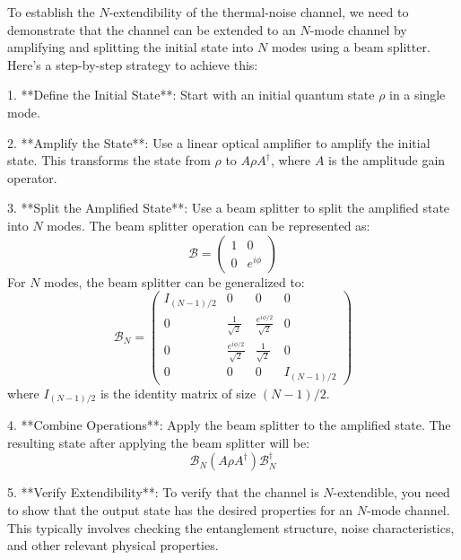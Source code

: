 To establish the \( N \)-extendibility of the thermal-noise channel, we need to demonstrate that the channel can be extended to an \( N \)-mode channel by amplifying and splitting the initial state into \( N \) modes using a beam splitter. Here's a step-by-step strategy to achieve this:

1. **Define the Initial State**: Start with an initial quantum state \(\rho\) in a single mode.

2. **Amplify the State**: Use a linear optical amplifier to amplify the initial state. This transforms the state from \(\rho\) to \(A\rho A^\dagger\), where \(A\) is the amplitude gain operator.

3. **Split the Amplified State**: Use a beam splitter to split the amplified state into \(N\) modes. The beam splitter operation can be represented as:
   \[
   \mathcal{B} = \begin{pmatrix}
   1 & 0 \\
   0 & e^{i\phi}
   \end{pmatrix}
   \]
   For \(N\) modes, the beam splitter can be generalized to:
   \[
   \mathcal{B}_N = \begin{pmatrix}
   I_{(N-1)/2} & 0 & 0 & 0 \\
   0 & \frac{1}{\sqrt{2}} & \frac{e^{i\phi/2}}{\sqrt{2}} & 0 \\
   0 & \frac{e^{i\phi/2}}{\sqrt{2}} & \frac{1}{\sqrt{2}} & 0 \\
   0 & 0 & 0 & I_{(N-1)/2}
   \end{pmatrix}
   \]
   where \(I_{(N-1)/2}\) is the identity matrix of size \((N-1)/2\).

4. **Combine Operations**: Apply the beam splitter to the amplified state. The resulting state after applying the beam splitter will be:
   \[
   \mathcal{B}_N(A\rho A^\dagger)\mathcal{B}_N^\dagger
   \]

5. **Verify Extendibility**: To verify that the channel is \(N\)-extendible, you need to show that the output state has the desired properties for an \(N\)-mode channel. This typically involves checking the entanglement structure, noise characteristics, and other relevant physical properties.

